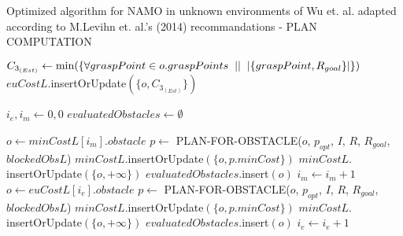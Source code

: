 \begin{algorithm}[H]

  \caption{Optimized algorithm for NAMO in unknown environments of Wu et. al. adapted according to M.Levihn et. al.'s (2014) recommandations - PLAN COMPUTATION}

  \label{alg:02-levihn-makeplan}

  \begin{algorithmic}[1]


          \State $C_{3_{(Est)}} \gets \min(\{\forall graspPoint \in o.graspPoints \hspace{0.2cm} || \hspace{0.2cm} |\{graspPoint, R_{goal}\}|\})$
          \State $euCostL$.insertOrUpdate$(\{o, C_{3_{(Est)}}\})$
      \EndFor

      \State $i_{e}, i_{m} \gets 0 , 0$
      \State $evaluatedObstacles \gets \emptyset$ \label{lst:line:evaluated_obstacles_note_1}

       \label{lst:line:stop_condition_obs_loop}
         \label{lst:line:mincostl_first}
          \State $o \gets minCostL[i_{m}].obstacle$
           \label{lst:line:evaluated_obstacles_note_2}
            \State $p \gets$ PLAN-FOR-OBSTACLE($o$, $p_{opt}$, $I$, $R$, $R_{goal}$, $blockedObsL$)
              \State $minCostL.$insertOrUpdate$(\{o, p.minCost\})$
            \Else
              \State $minCostL.$insertOrUpdate$(\{o, +\infty\})$
            \EndIf
            \State $evaluatedObstacles.$insert$(o)$ \label{lst:line:evaluated_obstacles_note_3}
          \EndIf
          \State $i_{m} \gets i_{m} + 1$
        \Else
           \label{lst:line:use_eucostl_1}
          \State $o \gets euCostL[i_{e}].obstacle$
             \label{lst:line:evaluated_obstacles_note_4}
              \State $p \gets$ PLAN-FOR-OBSTACLE($o$, $p_{opt}$, $I$, $R$, $R_{goal}$, $blockedObsL$)
                \State $minCostL.$insertOrUpdate$(\{o, p.minCost\})$
              \Else
                \State $minCostL.$insertOrUpdate$(\{o, +\infty\})$
              \EndIf
              \State $evaluatedObstacles.$insert$(o)$ \label{lst:line:evaluated_obstacles_note_5}
            \EndIf
          \EndIf
          \State $i_{e} \gets i_{e} + 1$ \label{lst:line:use_eucostl_2}
        \EndIf
      \EndWhile
    \EndProcedure
  \end{algorithmic}
\end{algorithm}
